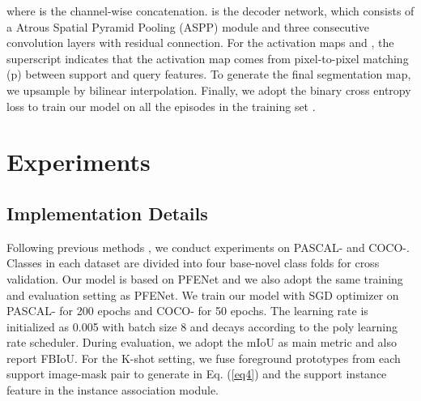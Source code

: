 \documentclass{bmvc2k}
\begin{document}
where  is the channel-wise concatenation.  is the decoder network, which consists of a Atrous Spatial Pyramid Pooling (ASPP) module \cite{chen2017rethinking} and three consecutive convolution layers with residual connection. For the activation maps  and , the superscript indicates that the activation map comes from pixel-to-pixel matching (p) \cite{tian2020prior} between support and query features. To generate the final segmentation map, we upsample  by bilinear interpolation. Finally, we adopt the binary cross entropy loss to train our model on all the episodes in the training set . 


 \section{Experiments}
\subsection{Implementation Details}
Following previous methods \cite{tian2020prior,min2021hypercorrelation}, we conduct experiments on PASCAL- and COCO-. Classes in each dataset are divided into four base-novel class folds for cross validation. Our model is based on PFENet \cite{tian2020prior} and we also adopt the same training and evaluation setting as PFENet. We train our model with SGD optimizer on PASCAL- for 200 epochs and COCO- for 50 epochs. The learning rate is initialized as 0.005 with batch size 8 and decays according to the  poly learning rate scheduler. During evaluation, we adopt the mIoU as main metric and also report FBIoU. For the K-shot setting, we fuse foreground prototypes from each support image-mask pair to generate  in Eq. (\ref{eq4}) and the support instance feature  in the instance association module. 
\end{document}

